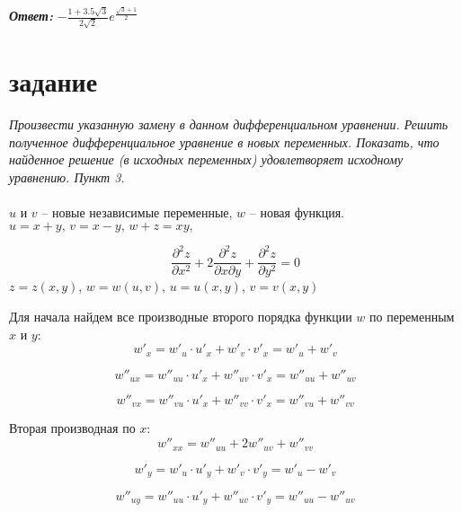 \documentclass[a5paper, 10pt]{article}
\theoremstyle{definition}
\theoremstyle{plain}
\theoremstyle{remark}
\begin{document}
\textit{\textbf{Ответ:}} $ - \frac{1 + 3.5 \sqrt{3}}{2\sqrt{2}}  e^{ \frac{\sqrt{3} + 1}{2}} $





\newpage

\section{задание}
\textit{Произвести указанную замену в данном дифференциальном уравнении. Решить полученное дифференциальное уравнение в новых переменных. Показать, что найденное решение (в исходных переменных) удовлетворяет исходному уравнению. Пункт 3.}\\
\\
$u$ и $v$ -- новые независимые переменные, $w$ -- новая функция. $u=x+y, \, v = x - y, \, w+z = xy,$

\begin{equation}
\frac{\partial^2 z}{\partial x^2} + 2 \frac{\partial^2 z}{\partial x \partial y} + \frac{\partial^2 z}{\partial y^2} = 0
\end{equation}
 $z=z(x, y)$, $w=w(u, v)$, $u = u(x, y)$, $v = v(x, y)$

Для начала найдем все производные второго порядка функции $w$ по переменным $x$ и $y$:
\begin{equation}
w'_x = w'_u \cdot u'_x + w'_v \cdot v'_x = w'_u + w'_v
\end{equation}

\begin{equation}
w''_{ux}  = w''_{uu} \cdot u'_x + w''_{uv} \cdot v'_x = w''_{uu} + w''_{uv}
\end{equation}

\begin{equation}
w''_{vx}  = w''_{vu} \cdot u'_x + w''_{vv} \cdot v'_x = w''_{vu} + w''_{vv}
\end{equation}

Вторая производная по  $x$:
\begin{equation}
w''_{xx} = w''_{uu} + 2w''_{uv} + w''_{vv}
\end{equation}


\begin{equation}
w'_y = w'_u \cdot u'_y + w'_v \cdot v'_y = w'_u - w'_v
\end{equation}

\begin{equation}
w''_{uy}  = w''_{uu} \cdot u'_y + w''_{uv} \cdot v'_y = w''_{uu} - w''_{uv}
\end{equation}
\end{document}
